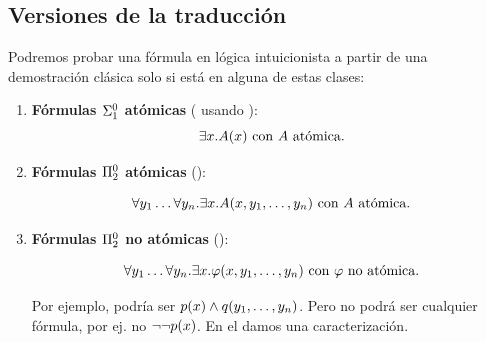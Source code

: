 \subsection{Versiones de la traducción}

Podremos probar una fórmula en lógica intuicionista a partir de una demostración clásica solo si está en alguna de estas clases:

\begin{enumerate}
    \item \textbf{Fórmulas $\Sigma^0_{1}$ atómicas} ( usando ):
          \[
              \exists x . A(x) \text{ con } A \text{ atómica.}
          \]
    \item \textbf{Fórmulas $\Pi^0_{2}$ atómicas} ():

          \[
              \forall y_1 \dots \forall y_n . \exists x . A(x, y_1, \dots, y_n) \text{ con } A \text{ atómica}.
          \]

    \item \textbf{Fórmulas $\Pi^0_{2}$ no atómicas} ():

          \[
              \forall y_1 \dots \forall y_n . \exists x . \varphi(x, y_1, \dots, y_n) \text{ con } \varphi \text{ no atómica}.
          \]

          Por ejemplo, podría ser $p(x) \wedge q(y_1, \dots, y_n)$.
          Pero no podrá ser cualquier fórmula, por ej. no $\neg \neg p(x)$. En el  damos una caracterización.
\end{enumerate}


